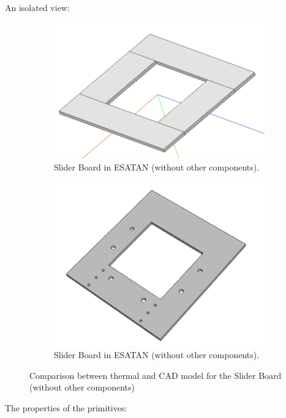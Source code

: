 An isolated view:

\begin{figure}[H]
    \centering
    \begin{subfigure}{.5\textwidth}
      \centering
      \includegraphics[width=.6\linewidth]{res/img/5_simulationanalisys/Comparisons/ESATAN/SliderPCB_raw.PNG}
      \caption{Slider Board in ESATAN (without other components).}
      \label{fig:sliderrawpcb}
    \end{subfigure}%
    \begin{subfigure}{.5\textwidth}
      \centering
      \includegraphics[width=.5\linewidth]{res/img/5_simulationanalisys/Comparisons/SLDW/SliderPCB_Raw_Solid.PNG}
      \caption{Slider Board in ESATAN (without other components).}
      \label{fig:sliderpcbrawsolid}
    \end{subfigure}
    \caption{Comparison between thermal and CAD model for the Slider Board (without other components)}
    \label{fig:sliderpcbrawim}
\end{figure}


The properties of the primitives:

